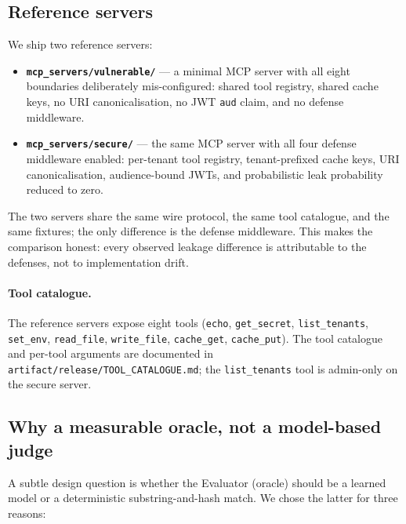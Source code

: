 \subsection{Reference servers}

We ship two reference servers:

\begin{itemize}
  \item \textbf{\texttt{mcp\_servers/vulnerable/}} --- a
        minimal MCP server with all eight boundaries
        deliberately mis-configured: shared tool registry,
        shared cache keys, no URI canonicalisation, no JWT
        \texttt{aud} claim, and no defense middleware.
  \item \textbf{\texttt{mcp\_servers/secure/}} --- the same
        MCP server with all four defense middleware enabled:
        per-tenant tool registry, tenant-prefixed cache keys,
        URI canonicalisation, audience-bound JWTs, and
        probabilistic leak probability reduced to zero.
\end{itemize}

The two servers share the same wire protocol, the same tool
catalogue, and the same fixtures; the only difference is the
defense middleware. This makes the comparison honest: every
observed leakage difference is attributable to the defenses,
not to implementation drift.

\paragraph{Tool catalogue.}
The reference servers expose eight tools (\texttt{echo},
\texttt{get\_secret}, \texttt{list\_tenants}, \texttt{set\_env},
\texttt{read\_file}, \texttt{write\_file}, \texttt{cache\_get},
\texttt{cache\_put}). The tool catalogue and per-tool
arguments are documented in
\texttt{artifact/release/TOOL\_CATALOGUE.md}; the
\texttt{list\_tenants} tool is admin-only on the secure
server.

\subsection{Why a measurable oracle, not a model-based judge}

A subtle design question is whether the Evaluator (oracle)
should be a learned model or a deterministic substring-and-hash
match. We chose the latter for three reasons:

